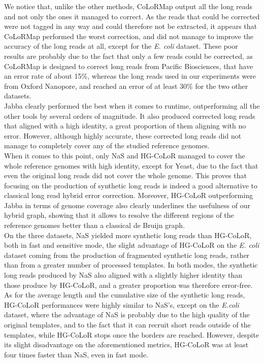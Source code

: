 \documentclass[long, final]{jobim2017}
\begin{document}
We notice that, unlike the other methods, CoLoRMap output all the long reads and not only the ones it managed to correct. As the reads that could be corrected were not tagged in any way and could therefore not be extracted, it appears that CoLoRMap performed the worst correction, and did not manage to improve the accuracy of the long reads at all, except for the \emph{E. coli} dataset. These poor results are probably due to the fact that only a few reads could be corrected, as CoLoRMap is designed to correct long reads from Pacific Biosciences, that have an error rate of about 15\%, whereas the long reads used in our experiments were from Oxford Nanopore, and reached an error of at least 30\% for the two other datasets. \\
\indent Jabba clearly performed the best when it comes to runtime, outperforming all the other tools by several orders of magnitude. It also produced corrected long reads that aligned with a high identity, a great proportion of them aligning with no error. However, although highly accurate, these corrected long reads did not manage to completely cover any of the studied reference genomes. \\
\indent When it comes to this point, only NaS and HG-CoLoR managed to cover the whole reference genomes with high identity, except for Yeast, due to the fact that even the original long reads did not cover the whole genome. This proves that focusing on the production of synthetic long reads is indeed a good alternative to classical long read hybrid error correction. Moreover, HG-CoLoR outperforming Jabba in terms of genome coverage also clearly underlines the usefulness of our hybrid graph, showing that it allows to resolve the different regions of the reference genomes better than a classical de Bruijn graph. \\
\indent On the three datasets, NaS yielded more synthetic long reads than HG-CoLoR, both in fast and sensitive mode, the slight advantage of HG-CoLoR on the \emph{E. coli} dataset coming from the production of fragmented synthetic long reads, rather than from a greater number of processed templates. In both modes, the synthetic long reads produced by NaS also aligned with a slightly higher identity than those produce by HG-CoLoR, and a greater proportion was therefore error-free. As for the average length and the cumulative size of the synthetic long reads, HG-CoLoR performances were highly similar to NaS's, except on the \emph{E.coli} dataset, where the advantage of NaS is probably due to the high quality of the original templates, and to the fact that it can recruit short reads outside of the templates, while HG-CoLoR stops once the borders are reached. However, despite its slight disadvantage on the aforementioned metrics, HG-CoLoR was at least four times faster than NaS, even in fast mode.
\end{document}
